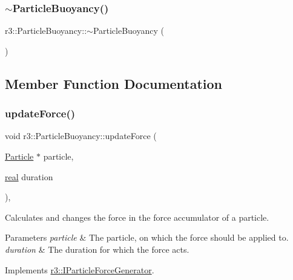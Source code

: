 \subsubsection{\texorpdfstring{$\sim$\+Particle\+Buoyancy()}{~ParticleBuoyancy()}}
{\footnotesize\ttfamily r3\+::\+Particle\+Buoyancy\+::$\sim$\+Particle\+Buoyancy (\begin{DoxyParamCaption}{ }\end{DoxyParamCaption})\hspace{0.3cm}{\ttfamily [default]}}



\subsection{Member Function Documentation}
\mbox{\label{classr3_1_1_particle_buoyancy_ad1249e51508770fd9b1775c8e22eb51a}} 
\subsubsection{\texorpdfstring{update\+Force()}{updateForce()}}
{\footnotesize\ttfamily void r3\+::\+Particle\+Buoyancy\+::update\+Force (\begin{DoxyParamCaption}\item[{\mbox{\hyperlink{classr3_1_1_particle}{Particle}} $\ast$}]{particle,  }\item[{\mbox{\hyperlink{namespacer3_ab2016b3e3f743fb735afce242f0dc1eb}{real}}}]{duration }\end{DoxyParamCaption})\hspace{0.3cm}{\ttfamily [override]}, {\ttfamily [virtual]}}



Calculates and changes the force in the force accumulator of a particle. 


\begin{DoxyParams}{Parameters}
{\em particle} & The particle, on which the force should be applied to. \\
\hline
{\em duration} & The duration for which the force acts. \\
\hline
\end{DoxyParams}


Implements \mbox{\hyperlink{classr3_1_1_i_particle_force_generator_a8b692fc3a40f815dc44c106b451c3a90}{r3\+::\+I\+Particle\+Force\+Generator}}.



